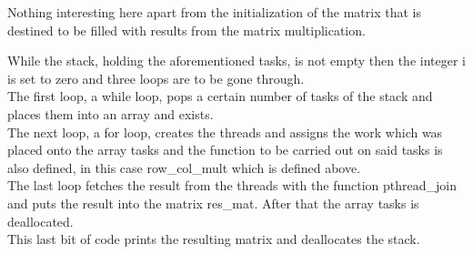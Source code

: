 Nothing interesting here apart from the initialization of the matrix that is
destined to be filled with results from the matrix multiplication.

While the stack, holding the aforementioned tasks, is not empty then the integer
i is set to zero and three loops are to be gone through.\\
The first loop, a while loop, pops a certain number of tasks of the stack and
places them into an array and exists.\\
The next loop, a for loop, creates the threads and assigns the work which was
placed onto the array \textsf{tasks} and the function to be carried out on said
tasks is also defined, in this case \textsf{row\_col\_mult} which is defined
above.\\
The last loop fetches the result from the threads with the function
\textsf{pthread\_join} and puts the result into the matrix \textsf{res\_mat}.
After that the array tasks is deallocated.\\

This last bit of code prints the resulting matrix and deallocates the stack.
